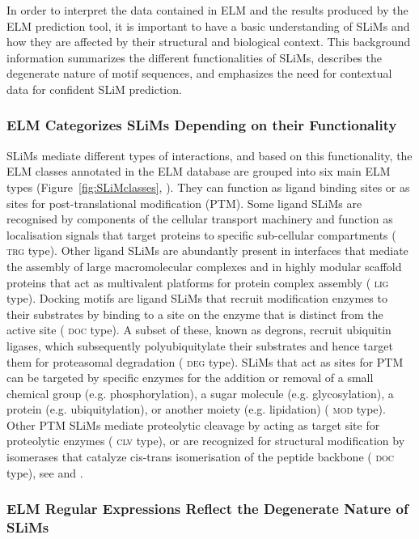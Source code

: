 \documentclass[12pt]{article}
\newcommand\motif[1]{%
    \textsc{\lowercase{#1}}%
}
\begin{document}
In order to interpret the data contained in ELM and the results produced by the
ELM prediction tool, it is important to have a basic understanding of SLiMs
and how they are affected by their structural and biological context. This
background information summarizes the different functionalities of SLiMs,
describes the degenerate nature of motif sequences, and emphasizes the need for
contextual data for confident SLiM prediction.

\subsubsection*{ELM Categorizes SLiMs Depending on their Functionality}

SLiMs mediate different types of interactions, and based on this functionality,
the ELM classes annotated in the ELM database are grouped into six main ELM
types (Figure~\ref{fig:SLiMclasses}, \cite{24214962}). They can function as ligand binding sites or
as sites for post-translational modification (PTM). Some ligand SLiMs are
recognised by components of the cellular transport machinery and function as
localisation signals that target proteins to specific sub-cellular compartments
(\motif{TRG} type). Other ligand SLiMs are abundantly present in interfaces that mediate
the assembly of large macromolecular complexes and in highly modular scaffold
proteins that act as multivalent platforms for protein complex assembly
(\motif{LIG} type). Docking motifs are ligand SLiMs that recruit modification enzymes to
their substrates by binding to a site on the enzyme that is distinct from the
active site (\motif{DOC} type). A subset of these, known as degrons, recruit ubiquitin
ligases, which subsequently polyubiquitylate their substrates and hence target
them for proteasomal degradation (\motif{DEG} type). SLiMs that act as sites for PTM can
be targeted by specific enzymes for the addition or removal of a small chemical
group (e.g. phosphorylation), a sugar molecule (e.g. glycosylation), a protein
(e.g. ubiquitylation), or another moiety (e.g. lipidation) (\motif{MOD} type). Other PTM
SLiMs mediate proteolytic cleavage by acting as target site for proteolytic
enzymes (\motif{CLV} type), or are recognized for structural modification by isomerases
that catalyze cis-trans isomerisation of the peptide backbone (\motif{DOC} type), see
\cite{24926813} and \cite{24773235}.

\subsubsection*{ELM Regular Expressions Reflect the Degenerate Nature of SLiMs}
\end{document}
